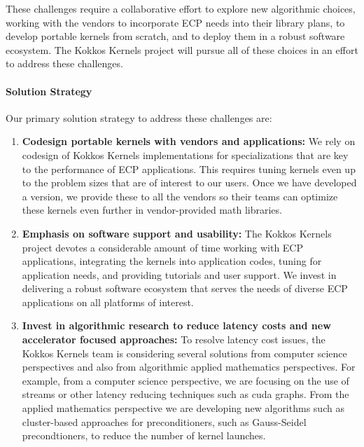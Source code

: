 These challenges require a collaborative effort to explore new algorithmic choices,
working with the vendors to incorporate ECP needs into their library plans, to develop
portable kernels from scratch, and to deploy them in a robust software ecosystem. The Kokkos
Kernels project will pursue all of these choices in an effort to address these challenges.

\paragraph{Solution Strategy}

Our primary solution strategy to address these challenges are:
\begin{enumerate}
    \item \textbf{Codesign portable kernels with vendors and applications:}
    We rely on codesign of Kokkos Kernels implementations for
    specializations that are key to the performance of ECP applications. This
    requires tuning kernels even up to the problem sizes that are of interest
    to our users. Once we have developed a version, we provide these
    to all the vendors so their teams can optimize these kernels even
    further in vendor-provided math libraries.
   \item \textbf{Emphasis on software support and usability:}
	The Kokkos Kernels project devotes a considerable amount of time working with
	ECP applications, integrating the kernels into application codes, tuning
	for application needs, and providing tutorials and user support. We invest
	in delivering a robust software ecosystem that serves the
	needs of diverse ECP applications on all platforms of interest.
   \item \textbf{Invest in algorithmic research to reduce latency costs and new accelerator focused approaches:} 
   To resolve latency cost issues, the Kokkos Kernels team is considering several solutions from computer science
   perspectives and also from algorithmic applied mathematics perspectives. 
   For example, from a computer science perspective, we are focusing on the
   use of streams or other latency reducing techniques such as cuda graphs. From
   the applied mathematics perspective we are developing new algorithms such
   as cluster-based approaches for preconditioners, such as Gauss-Seidel precondtioners,
   to reduce the number of kernel launches. 
\end{enumerate}

